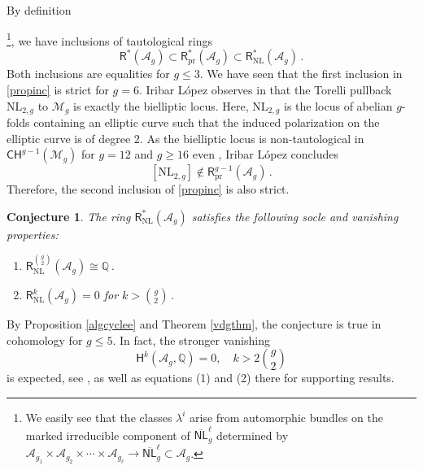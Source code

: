 \documentclass[11pt]{amsart}
\newtheorem{conj}[thm]{Conjecture}
\theoremstyle{definition}
\newtheorem{question}[thm]{Question}
\newcommand{\qq}{\mathbb{Q}}
\newcommand{\M}{\mathcal{M}}
\newcommand{\A}{\mathcal{A}}
\renewcommand{\H}{\mathsf{H}}
\begin{document}
By definition{{\footnote{We easily see
that the classes $\lambda^i$ arise
from automorphic bundles on the
marked irreducible component of $\overline{\mathsf{NL}}^\ell_g$ determined by
$\mathcal{A}_{g_1} \times \mathcal{A}_{g_2} \times \cdots \times \mathcal{A}_{g_\ell}
\rightarrow \overline{\mathsf{NL}}^\ell_g \subset \A_g$.}}, we have inclusions of tautological rings
\begin{equation} \label{propinc}
\mathsf{R}^*(\mathcal{A}_g) \subset
\mathsf{R}^*_{\mathrm{pr}}(\mathcal{A}_g) \subset
\mathsf{R}^*_{\mathrm{NL}}(\mathcal{A}_g)\, . 
\end{equation}
Both inclusions are equalities for $g\leq 3$.
We have seen that the first inclusion in \eqref{propinc} is strict
for $g=6$. Iribar L\'opez observes
in \cite{Iribar} that the Torelli pullback $\mathrm{NL}_{2,g}$ to $\M_g$ is exactly the
bielliptic locus. Here, $\mathrm{NL}_{2,g}$ is the locus of abelian $g$-folds containing an elliptic curve such that the induced polarization on the elliptic curve is of degree $2$. As the bielliptic locus is non-tautological in $\mathsf{CH}^{g-1}(\mathcal{M}_g)$
for $g=12$ and $g\geq 16$ even \cite{ACC+,Zelm}, 
Iribar L\'opez concludes
$$[\mathrm{NL}_{2,g}] \notin
\mathsf{R}^{g-1}_{\mathrm{pr}}(\mathcal{A}_g) \,.$$
Therefore, the
second inclusion
of \eqref{propinc} is
also strict.



\begin{conj}\label{soclevan}
    The ring $\mathsf{R}^*_{\mathrm{NL}}(\A_g)$ satisfies the following socle and vanishing properties:
    \begin{enumerate}
        \item [\textnormal{(i)}]$\mathsf{R}^{\binom{g}{2}}_{\mathrm{NL}}(\A_g)\cong \qq\,$.
        \item [\textnormal{(ii)}] $\mathsf{R}^{k}_{\mathrm{NL}}(\A_g)=0$ for $k>\binom{g}{2}\,$.
    \end{enumerate}
\end{conj}
By Proposition \ref{algcyclee} and Theorem \ref{vdgthm}, the conjecture is true in cohomology for $g\leq 5$. In fact, the stronger vanishing $$\H^{k}(\A_g, \mathbb Q)=0, \quad k>2\binom{g}{2}$$ is expected, see \cite [Question 1.1]{toptop}, as well as equations (1) and (2) there for supporting results. 

}
\end{document}
